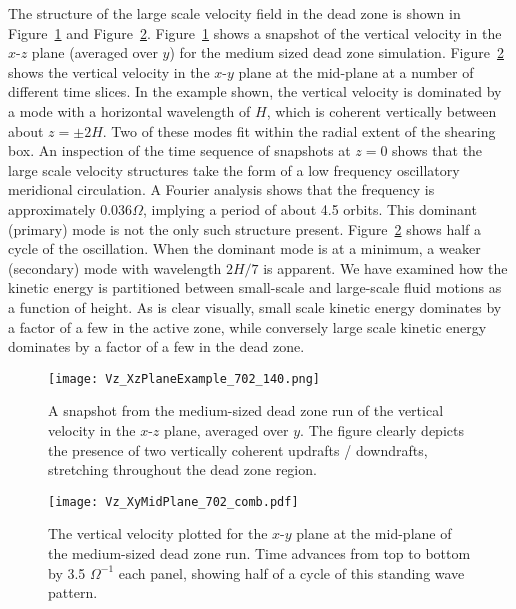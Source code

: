 The structure of the large scale velocity field in the dead zone is shown in Figure~\ref{figVzLs} and 
Figure~\ref{figVzLs2}. Figure~\ref{figVzLs} shows a snapshot of the vertical velocity in the $x$-$z$ plane (averaged over $y$) for the medium sized dead zone simulation. Figure~\ref{figVzLs2} shows the vertical velocity in the $x$-$y$ plane at the mid-plane at a number of different time slices. In the example shown, the vertical velocity is dominated by a mode with a horizontal wavelength of $H$, which is coherent vertically between about $z = \pm2H$. Two of these modes fit within the radial extent of the shearing box. An inspection of the time sequence of snapshots at $z = 0$ shows that the large scale velocity structures take the form of a low frequency oscillatory meridional circulation. 
A Fourier analysis shows that the frequency is approximately $0.036 \Omega$, implying a period of about 4.5 orbits. This dominant (primary) mode is not the only such structure present. Figure~\ref{figVzLs2} shows half a cycle of the oscillation. When the dominant mode is at a minimum, a weaker (secondary) mode with wavelength $2H/7$ is apparent. We have examined how the kinetic energy is partitioned between small-scale and large-scale fluid motions as a function of height. As is clear visually, small scale kinetic energy dominates by a factor of a few in the active zone, while conversely large scale kinetic energy dominates by a factor of a few in the dead zone.

\begin{figure}[p]
\centering
\texttt{[image: Vz\_XzPlaneExample\_702\_140.png]}
\caption{A snapshot from the medium-sized dead zone run of the vertical velocity in the $x$-$z$ plane, averaged over $y$. The figure clearly depicts the presence of two 
vertically coherent updrafts / downdrafts, stretching throughout the dead zone region.}
\label{figVzLs}
\end{figure}

\begin{figure}[p]
\centering
\texttt{[image: Vz\_XyMidPlane\_702\_comb.pdf]}
\caption{The vertical velocity plotted for the $x$-$y$ plane at the mid-plane of the medium-sized dead zone run.  Time advances from top to bottom by 3.5 $\Omega^{-1}$ each panel, showing half of a cycle of this standing wave pattern.}
\label{figVzLs2}
\end{figure}

